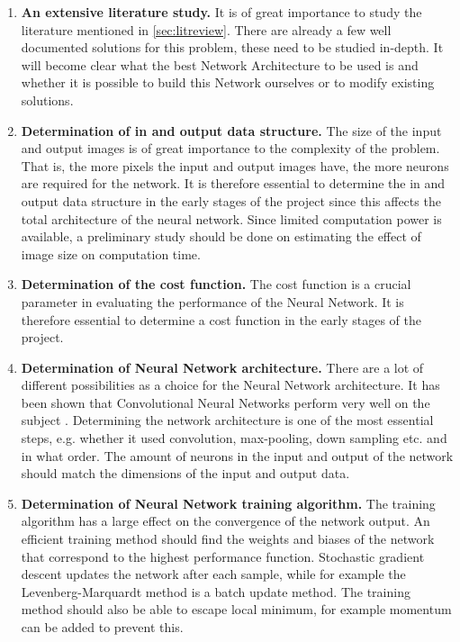 \begin{enumerate}
\item	\textbf{An extensive literature study.}
It is of great importance to study the literature mentioned in \ref{sec:litreview}. There are already a few well documented solutions for this problem, these need to be studied in-depth. It will become clear what the best Network Architecture to be used is and whether it is possible to build this Network ourselves or to modify existing solutions.

\item \textbf{Determination of in and output data structure.}
The size of the input and output images is of great importance to the complexity of the problem. That is, the more pixels the input and output images have, the more neurons are required for the network. It is therefore essential to determine the in and output data structure in the early stages of the project since this affects the total architecture of the neural network. Since limited computation power is available, a preliminary study should be done on estimating the effect of image size on computation time. 

\item \textbf{Determination of the cost function.}
The cost function is a crucial parameter in evaluating the performance of the Neural Network. It is therefore essential to determine a cost function in the early stages of the project.

\item \textbf{Determination of Neural Network architecture.}
There are a lot of different possibilities as a choice for the Neural Network architecture. It has been shown that Convolutional Neural Networks perform very well on the subject \cite{Dahl}. Determining the network architecture is one of the most essential steps, e.g. whether it used convolution, max-pooling, down sampling etc. and in what order. The amount of neurons in the input and output of the network should match the dimensions of the input and output data. 

\item \textbf{Determination of Neural Network training algorithm.}
The training algorithm has a large effect on the convergence of the network output. An efficient training method should find the  weights and biases of the network that correspond to the highest performance function. Stochastic gradient descent updates the network after each sample, while for example the Levenberg-Marquardt method is a batch update method. The training method should also be able to escape local minimum, for example momentum can be added to prevent this.


\end{enumerate}
